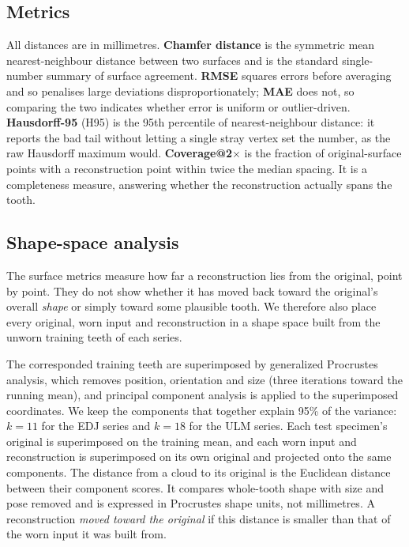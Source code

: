 \documentclass[10pt,a4paper,twocolumn]{article}
\begin{document}
\subsection{Metrics}

All distances are in millimetres. \textbf{Chamfer distance}
\citep{fan2017point} is the symmetric mean nearest-neighbour distance between two
surfaces and is the standard single-number summary of surface agreement.
\textbf{RMSE} squares errors before averaging and so penalises large deviations
disproportionately; \textbf{MAE} does not, so comparing the two indicates whether
error is uniform or outlier-driven. \textbf{Hausdorff-95} (H95) is the 95th
percentile of nearest-neighbour distance: it reports the bad tail without letting
a single stray vertex set the number, as the raw Hausdorff maximum would.
\textbf{Coverage@2$\times$} is the fraction of original-surface points with a
reconstruction point within twice the median spacing. It is a completeness measure,
answering whether the reconstruction actually spans the tooth.

\subsection{Shape-space analysis}
\label{sec:shapespace}

The surface metrics measure how far a reconstruction lies from the original,
point by point. They do not show whether it has moved back toward the original's
overall \emph{shape} or simply toward some plausible tooth. We therefore also
place every original, worn input and reconstruction in a shape space built from
the unworn training teeth of each series.

The corresponded training teeth are superimposed by generalized Procrustes
analysis, which removes position, orientation and size (three iterations toward
the running mean), and principal component analysis is applied to the
superimposed coordinates. We keep the components that together explain 95\% of
the variance: $k=11$ for the EDJ series and $k=18$ for the ULM series. Each test
specimen's original is superimposed on the training mean, and each worn input and
reconstruction is superimposed on its own original and projected onto the same
components. The distance from a cloud to its original is the Euclidean distance
between their component scores. It compares whole-tooth shape with size and pose
removed and is expressed in Procrustes shape units, not millimetres. A
reconstruction \emph{moved toward the original} if this distance is smaller than
that of the worn input it was built from.
\end{document}

